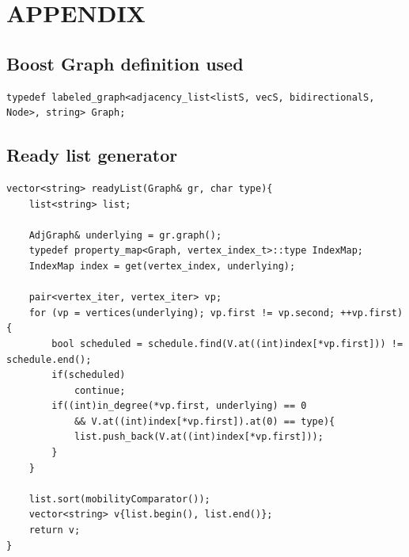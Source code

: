 \documentclass[letterpaper, 10 pt, conference]{ieeeconf}  %
\begin{document}
\section{APPENDIX}

\subsection{Boost Graph definition used}
\label{typedef}
\begin{verbatim}
typedef labeled_graph<adjacency_list<listS, vecS, bidirectionalS, Node>, string> Graph;
\end{verbatim}


\subsection{Ready list generator}
\label{ready}
\begin{verbatim}
vector<string> readyList(Graph& gr, char type){
    list<string> list;

    AdjGraph& underlying = gr.graph();
    typedef property_map<Graph, vertex_index_t>::type IndexMap;
    IndexMap index = get(vertex_index, underlying);

    pair<vertex_iter, vertex_iter> vp;
    for (vp = vertices(underlying); vp.first != vp.second; ++vp.first) {
        bool scheduled = schedule.find(V.at((int)index[*vp.first])) != schedule.end();
        if(scheduled)
            continue;
        if((int)in_degree(*vp.first, underlying) == 0 
            && V.at((int)index[*vp.first]).at(0) == type){
            list.push_back(V.at((int)index[*vp.first]));
        }
    }

    list.sort(mobilityComparator());
    vector<string> v{list.begin(), list.end()};
    return v;
}
\end{verbatim}
\end{document}
